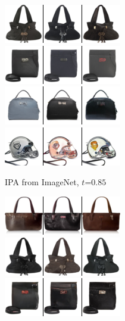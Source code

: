 \begin{figure}[t]
\begin{subfigure}[t]{0.27\textwidth}
      \includegraphics[height=\edgesstuffimgheight]{figs/cigcvae/image-samples/bags/image_aipo_1_t=0.85_imagenet_samples.png}
      \includegraphics[height=\edgesstuffimgheight]{figs/cigcvae/image-samples/bags/image_aipo_2_t=0.85_imagenet_samples.png}
      \includegraphics[height=\edgesstuffimgheight]{figs/cigcvae/image-samples/bags/image_aipo_3_t=0.85_imagenet_samples.png}
      \includegraphics[height=\edgesstuffimgheight]{figs/cigcvae/image-samples/bags/image_aipo_4_t=0.85_imagenet_samples.png}
      \caption{\scriptsize IPA from ImageNet, $t$=$0.85$}
    \end{subfigure}
    \begin{subfigure}[t]{0.27\textwidth}
      \centering
      \includegraphics[height=\edgesstuffimgheight]{figs/cigcvae/image-samples/bags/image_aipo_0_imagenet_samples.png}
      \includegraphics[height=\edgesstuffimgheight]{figs/cigcvae/image-samples/bags/image_aipo_1_imagenet_samples.png}
      \includegraphics[height=\edgesstuffimgheight]{figs/cigcvae/image-samples/bags/image_aipo_2_imagenet_samples.png}

\end{subfigure}
\end{figure}
